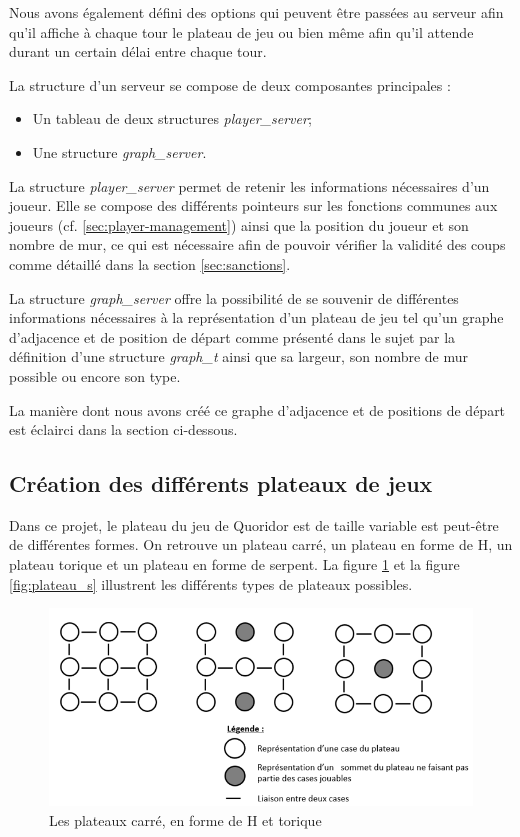 \documentclass[11pt]{article}
\begin{document}
Nous avons également défini des options qui peuvent être passées au serveur afin qu'il affiche à chaque tour le plateau de jeu ou bien même afin qu'il attende durant un certain délai entre chaque tour.

La structure d'un serveur se compose de deux composantes principales :
\begin{itemize}
    \item Un tableau de deux structures \textit{player\_server};
    \item Une structure \textit{graph\_server}.
\end{itemize}

La structure \textit{player\_server} permet de retenir les informations nécessaires d'un joueur. Elle se compose des différents pointeurs sur les fonctions communes aux joueurs (cf. \ref{sec:player-management}) ainsi que la position du joueur et son nombre de mur, ce qui est nécessaire afin de pouvoir vérifier la validité des coups comme détaillé dans la section \ref{sec:sanctions}.

La structure \textit{graph\_server} offre la possibilité de se souvenir de différentes informations nécessaires à la représentation d'un plateau de jeu tel qu'un graphe d'adjacence et de position de départ comme présenté dans le sujet par la définition d'une structure \textit{graph\_t} ainsi que sa largeur, son nombre de mur possible ou encore son type.


La manière dont nous avons créé ce graphe d'adjacence et de positions de départ est éclairci dans la section ci-dessous.

\subsection{Création des différents plateaux de jeux}

Dans ce projet, le plateau du jeu de Quoridor est de taille variable est peut-être de différentes formes. On retrouve un plateau carré, un plateau en forme de H, un plateau torique et un plateau en forme de serpent. La figure \ref{fig:plateau_cth} et la figure \ref{fig:plateau_s} illustrent les différents types de plateaux possibles.

\begin{figure}[H]
    \centering
    \includegraphics[scale = 0.5]{plateau_carre_tore_h.png}
    \caption{Les plateaux carré, en forme de H et torique}
    \label{fig:plateau_cth}
\end{figure}
\end{document}
